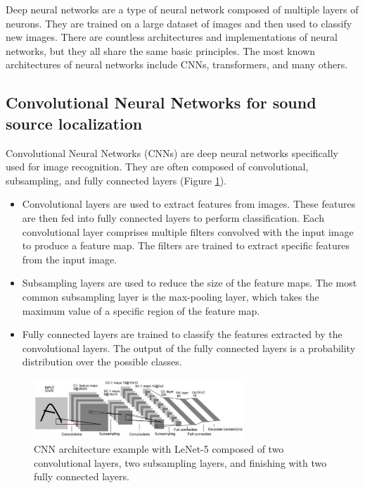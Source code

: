 Deep neural networks are a type of neural network composed of multiple layers of neurons\cite{Schmidhuber_2015}. They are trained on a large dataset of images and then used to classify new images. There are countless architectures \cite{LIU201711} and implementations of neural networks, but they all share the same basic principles. The most known architectures of neural networks include CNNs\cite{oshea2015introduction}, transformers\cite{vaswani2017attention}, and many others.

\subsection{Convolutional Neural Networks for sound source localization}

Convolutional Neural Networks (CNNs)\cite{oshea2015introduction} are deep neural networks specifically used for image recognition. They are often composed of convolutional, subsampling, and fully connected layers (Figure \ref*{fig:cnn_example}).
\begin{itemize}
    \item{} Convolutional layers are used to extract features from images. These features are then fed into fully connected layers to perform classification. Each convolutional layer comprises multiple filters convolved with the input image to produce a feature map. The filters are trained to extract specific features from the input image.
    \item{} Subsampling layers are used to reduce the size of the feature maps. The most common subsampling layer is the max-pooling layer, which takes the maximum value of a specific region of the feature map.
    \item{} Fully connected layers are trained to classify the features extracted by the convolutional layers. The output of the fully connected layers is a probability distribution over the possible classes. 
\end{itemize}

\begin{figure}[H]
    \centering
    \includegraphics[width=0.7\textwidth]{../Images/cnn_example.png}
    \caption{CNN architecture example with LeNet-5 \protect\cite{726791} composed of two convolutional layers, two subsampling layers, and finishing with two fully connected layers.}
    \label{fig:cnn_example}
\end{figure}

